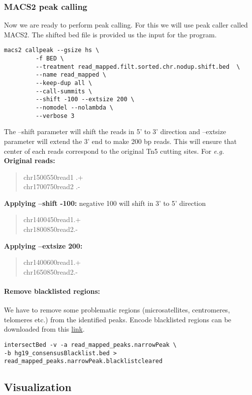 \documentclass[10pt]{article}
\newcommand\tab[1][1cm]{\hspace*{#1}}
\begin{document}
\subsubsection{MACS2 peak calling} Now we are ready to perform peak calling. For this we will use  peak caller called MACS2. The shifted bed file is provided us the input for the program.
\begin{verbatim}
macs2 callpeak --gsize hs \
         -f BED \
         --treatment read_mapped.filt.sorted.chr.nodup.shift.bed  \
         --name read_mapped \
         --keep-dup all \
         --call-summits \
         --shift -100 --extsize 200 \
         --nomodel --nolambda \
         --verbose 3
\end{verbatim}
The --shift parameter  will shift the reads in 5' to 3' direction and --extsize parameter will extend the 3' end to make 200 bp reads. This will ensure that center of each reads correspond to the original Tn5 cutting sites. For {\em e.g.}\\
\textbf{Original reads:}
\begin{verse}
chr1\tab 500\tab 550\tab read1 \tab .\tab +\\
chr1\tab 700\tab 750\tab read2 \tab .\tab-
\end{verse}
\textbf{Applying --shift -100:} negative 100 will shift in 3' to 5' direction
\begin{verse}
chr1\tab 400\tab 450\tab read1\tab .\tab +\\
chr1\tab 800\tab 850\tab read2\tab .\tab -
\end{verse}
\textbf{Applying --extsize 200:}
\begin{verse}
chr1\tab 400\tab 600\tab read1\tab .\tab +\\
chr1\tab 650\tab 850\tab read2\tab .\tab -
\end{verse}
\paragraph{Remove blacklisted regions:} We have to remove some problematic regions (microsatellites, centromeres, telomeres etc.) from the identified peaks. Encode blacklisted regions can be downloaded from this \href{https://sites.google.com/site/anshulkundaje/projects/blacklists}{link}.
\begin{verbatim}
intersectBed -v -a read_mapped_peaks.narrowPeak \
-b hg19_consensusBlacklist.bed > read_mapped_peaks.narrowPeak.blacklistcleared
\end{verbatim}
\subsection{Visualization}
\end{document}
